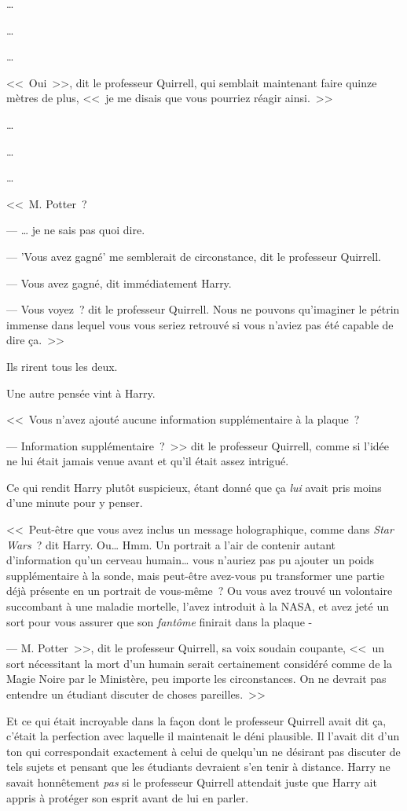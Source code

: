 …

…

…

<<~Oui~>>, dit le professeur Quirrell, qui semblait maintenant faire quinze mètres de plus, <<~je me disais que vous pourriez réagir ainsi.~>>

…

…

…

<<~M. Potter~?

--- … je ne sais pas quoi dire.

--- 'Vous avez gagné' me semblerait de circonstance, dit le professeur Quirrell.

--- Vous avez gagné, dit immédiatement Harry.

--- Vous voyez~? dit le professeur Quirrell. Nous ne pouvons qu'imaginer le pétrin immense dans lequel vous vous seriez retrouvé si vous n'aviez pas été capable de dire ça.~>>

Ils rirent tous les deux.

Une autre pensée vint à Harry.

<<~Vous n'avez ajouté aucune information supplémentaire à la plaque~?

--- Information supplémentaire~?~>> dit le professeur Quirrell, comme si l'idée ne lui était jamais venue avant et qu'il était assez intrigué.

Ce qui rendit Harry plutôt suspicieux, étant donné que ça \emph{lui} avait pris moins d'une minute pour y penser.

<<~Peut-être que vous avez inclus un message holographique, comme dans \emph{Star Wars}~? dit Harry. Ou… Hmm. Un portrait a l'air de contenir autant d'information qu'un cerveau humain… vous n'auriez pas pu ajouter un poids supplémentaire à la sonde, mais peut-être avez-vous pu transformer une partie déjà présente en un portrait de vous-même~? Ou vous avez trouvé un volontaire succombant à une maladie mortelle, l'avez introduit à la NASA, et avez jeté un sort pour vous assurer que son \emph{fantôme} finirait dans la plaque -

--- M. Potter~>>, dit le professeur Quirrell, sa voix soudain coupante, <<~un sort nécessitant la mort d'un humain serait certainement considéré comme de la Magie Noire par le Ministère, peu importe les circonstances. On ne devrait pas entendre un étudiant discuter de choses pareilles.~>>

Et ce qui était incroyable dans la façon dont le professeur Quirrell avait dit ça, c'était la perfection avec laquelle il maintenait le déni plausible. Il l'avait dit d'un ton qui correspondait exactement à celui de quelqu'un ne désirant pas discuter de tels sujets et pensant que les étudiants devraient s'en tenir à distance. Harry ne savait honnêtement \emph{pas} si le professeur Quirrell attendait juste que Harry ait appris à protéger son esprit avant de lui en parler.

